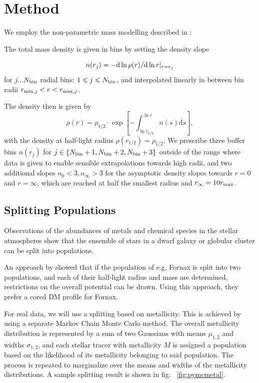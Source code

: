 \section{Method}\label{sec:method}
We employ the non-parametric mass modelling described in
\citep{Steger+2014}:

The total mass density is given in bins by setting the density slope

\begin{equation}
n(r_j)=-{\rm d}\ln\rho(r)/{\rm d}\ln r|_{r=r_j}
\end{equation}
for $j ... N_{\rm bin}$ radial bins: $1\leq j\leq N_{\rm bin}$, and
interpolated linearly in between bin radii $r_{{\rm min},j}<r<r_{{\rm
    max},j}$.

The density then is given by
\begin{equation*}
    \rho(r) = \rho_{1/2}\cdot\exp\left[-\int_{\ln r_{1/2}}^{\ln r}n(s)\text{d}s\right],
\end{equation*}
with the density at half-light radius $\rho(r_{1/2})=\rho_{1/2}$, We
prescribe three buffer bins $n(r_j)$ for $j\in\{N_{\rm bin}+1,
N_{\rm bin}+2, N_{\rm bin}+3\}$ outside of the range where data is given to
enable sensible extrapolations towards high radii, and two additional slopes
$n_0 < 3, n_\infty>3$ for the asymptotic density slopes towards $r=0$ and
$r=\infty$, which are reached at half the smallest radius and $r_\infty=10r_{\rm
  max}$.


\subsection{Splitting Populations}\label{sec:metals}
Observations of the abundances of metals and chemical species in the
stellar atmospheres show that the ensemble of stars in a dwarf galaxy
or globular cluster can be split into populations.

An approach by \cite{WalkerPenarrubia2011} showed that if the
population of e.g. Fornax is split into two populations, and each of
their half-light radius and mass are determined, restrictions on the
overall potential can be drawn. Using this approach, they prefer a
cored DM profile for Fornax.

For real data, we will use a splitting based on metallicity. This is
achieved by using a separate Markov Chain Monte Carlo method. The
overall metallicity distribution is represented by a sum of two
Gaussians with means $\mu_{1,2}$ and widths $\sigma_{1,2}$, and each
stellar tracer with metallicity $M$ is assigned a population based on
the likelihood of its metallicity belonging to said population. The
process is repeated to marginalize over the means and widths of the
metallicity distributions. A sample splitting result is shown in
fig. ~\ref{fig:pymcmetal}.

